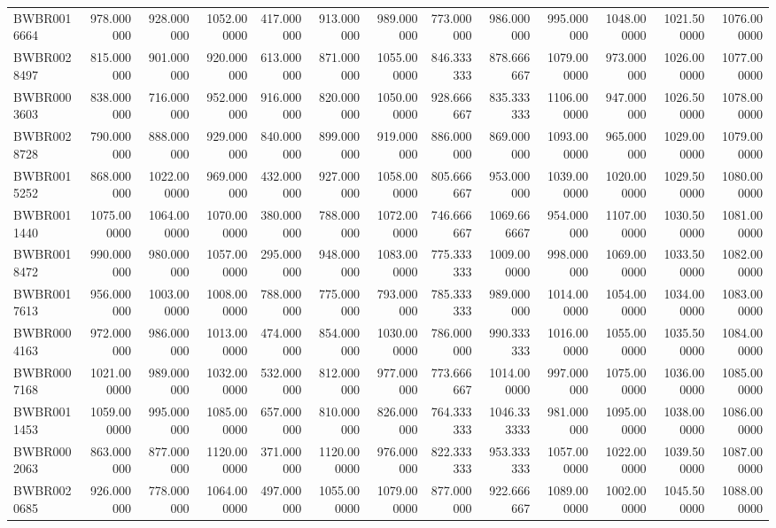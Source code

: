 \begin{longtable}{lrrrrrrrrrrrr}
BWBR0016664 & 978.000000 & 928.000000 & 1052.000000 & 417.000000 & 913.000000 & 989.000000 & 773.000000 & 986.000000 & 995.000000 & 1048.000000 & 1021.500000 & 1076.000000 \\
BWBR0028497 & 815.000000 & 901.000000 & 920.000000 & 613.000000 & 871.000000 & 1055.000000 & 846.333333 & 878.666667 & 1079.000000 & 973.000000 & 1026.000000 & 1077.000000 \\
BWBR0003603 & 838.000000 & 716.000000 & 952.000000 & 916.000000 & 820.000000 & 1050.000000 & 928.666667 & 835.333333 & 1106.000000 & 947.000000 & 1026.500000 & 1078.000000 \\
BWBR0028728 & 790.000000 & 888.000000 & 929.000000 & 840.000000 & 899.000000 & 919.000000 & 886.000000 & 869.000000 & 1093.000000 & 965.000000 & 1029.000000 & 1079.000000 \\
BWBR0015252 & 868.000000 & 1022.000000 & 969.000000 & 432.000000 & 927.000000 & 1058.000000 & 805.666667 & 953.000000 & 1039.000000 & 1020.000000 & 1029.500000 & 1080.000000 \\
BWBR0011440 & 1075.000000 & 1064.000000 & 1070.000000 & 380.000000 & 788.000000 & 1072.000000 & 746.666667 & 1069.666667 & 954.000000 & 1107.000000 & 1030.500000 & 1081.000000 \\
BWBR0018472 & 990.000000 & 980.000000 & 1057.000000 & 295.000000 & 948.000000 & 1083.000000 & 775.333333 & 1009.000000 & 998.000000 & 1069.000000 & 1033.500000 & 1082.000000 \\
BWBR0017613 & 956.000000 & 1003.000000 & 1008.000000 & 788.000000 & 775.000000 & 793.000000 & 785.333333 & 989.000000 & 1014.000000 & 1054.000000 & 1034.000000 & 1083.000000 \\
BWBR0004163 & 972.000000 & 986.000000 & 1013.000000 & 474.000000 & 854.000000 & 1030.000000 & 786.000000 & 990.333333 & 1016.000000 & 1055.000000 & 1035.500000 & 1084.000000 \\
BWBR0007168 & 1021.000000 & 989.000000 & 1032.000000 & 532.000000 & 812.000000 & 977.000000 & 773.666667 & 1014.000000 & 997.000000 & 1075.000000 & 1036.000000 & 1085.000000 \\
BWBR0011453 & 1059.000000 & 995.000000 & 1085.000000 & 657.000000 & 810.000000 & 826.000000 & 764.333333 & 1046.333333 & 981.000000 & 1095.000000 & 1038.000000 & 1086.000000 \\
BWBR0002063 & 863.000000 & 877.000000 & 1120.000000 & 371.000000 & 1120.000000 & 976.000000 & 822.333333 & 953.333333 & 1057.000000 & 1022.000000 & 1039.500000 & 1087.000000 \\
BWBR0020685 & 926.000000 & 778.000000 & 1064.000000 & 497.000000 & 1055.000000 & 1079.000000 & 877.000000 & 922.666667 & 1089.000000 & 1002.000000 & 1045.500000 & 1088.000000 \\

\end{longtable}
